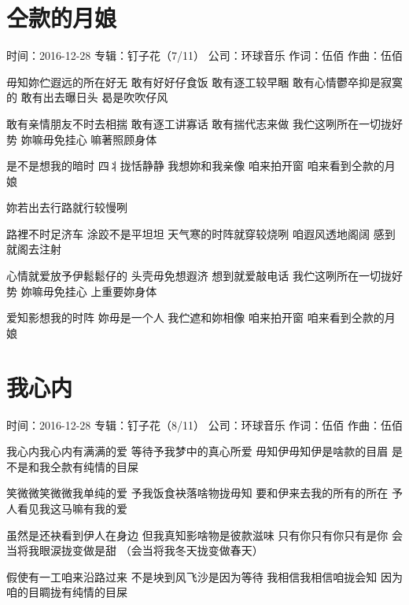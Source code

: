\documentclass[UTF8,a4paper,oneside,twocolumn,12pt]{ctexbook}
\newcommand{\infopair}[2]{\textbullet #1：#2}
\newcommand{\zc}[1][伍佰]{\infopair{作词}{#1}}
\newcommand{\zq}[1][伍佰]{\infopair{作曲}{#1}}
\newcommand{\zj}[1]{\infopair{专辑}{#1}}
\newcommand{\sj}[1]{\infopair{时间}{#1}}
\newcommand{\gs}[1]{\infopair{公司}{#1}}
\newenvironment{info}{\begin{flushleft}\kaishu
	}
	{\end{flushleft}\normalsize\yahei\par}
\newenvironment{lyric}{
	}
{}
\begin{document}
\section{仝款的月娘}
\begin{info}
	\sj{2016-12-28}
	\zj{钉子花（7/11）}
	\gs{环球音乐}
	\zc
	\zq
\end{info}
\begin{lyric}
	毋知妳伫遐远的所在好无
	敢有好好仔食饭 敢有逐工较早睏
	敢有心情鬱卒抑是寂寞的
	敢有出去曝日头 曷是吹吹仔风

	敢有亲情朋友不时去相揣
	敢有逐工讲寡话 敢有揣代志来做
	我伫这咧所在一切拢好势
	妳嘛毋免挂心 嘛著照顾身体

	是不是想我的暗时 四丬拢恬静静
	我想妳和我亲像
	咱来拍开窗
	咱来看到仝款的月娘

	妳若出去行路就行较慢咧

	路裡不时足济车 涂跤不是平坦坦
	天气寒的时阵就穿较烧咧
	咱遐风透地阁阔 感到就阁去注射

	心情就爱放予伊鬆鬆仔的
	头壳毋免想遐济 想到就爱敲电话
	我伫这咧所在一切拢好势
	妳嘛毋免挂心 上重要妳身体

	爱知影想我的时阵 妳毋是一个人
	我伫遮和妳相像
	咱来拍开窗
	咱来看到仝款的月娘
\end{lyric}

\section{我心内}
\begin{info}
	\sj{2016-12-28}
	\zj{钉子花（8/11）}
	\gs{环球音乐}
	\zc
	\zq
\end{info}
\begin{lyric}
	我心内我心内有满满的爱
	等待予我梦中的真心所爱
	毋知伊毋知伊是啥款的目眉
	是不是和我仝款有纯情的目屎

	笑微微笑微微我单纯的爱
	予我饭食袂落啥物拢毋知
	要和伊来去我的所有的所在
	予人看见我这马嘛有我的爱

	虽然是还袂看到伊人在身边
	但我真知影啥物是彼款滋味
	只有你只有你只有是你
	会当将我眼涙拢变做是甜
	（会当将我冬天拢变做春天）

	假使有一工咱来沿路过来
	不是坱到风飞沙是因为等待
	我相信我相信咱拢会知
	因为咱的目睭拢有纯情的目屎
\end{lyric}
\end{document}
